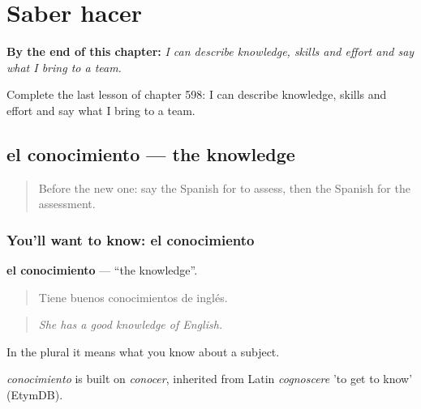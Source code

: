 
\chapter{Saber hacer}
\label{ch:es-saber-hacer}

\begin{chapteropening}
\textbf{By the end of this chapter:} \emph{I can describe knowledge, skills and effort and say what I bring to a team.}

Complete the last lesson of chapter 598: I can describe knowledge, skills and effort and say what I bring to a team.
\end{chapteropening}

\section[el conocimiento]{el conocimiento — the knowledge}

\label{lesson:ES-C598-conocimiento}



\begin{quote}
Before the new one: say the Spanish for to assess, then the Spanish for the assessment.
\end{quote}

\subsection*{You'll want to know: el conocimiento}
\textbf{el conocimiento} — \textquotedblleft{}the knowledge\textquotedblright{}.

\begin{quote}
Tiene buenos conocimientos de inglés.
\end{quote}

\begin{quote}
\emph{She has a good knowledge of English.}
\end{quote}

In the plural it means what you know about a subject.

\begin{cousinweb}
\emph{conocimiento} is built on \emph{conocer}, inherited from Latin \emph{cognoscere} 'to get to know' (EtymDB).
\end{cousinweb}

